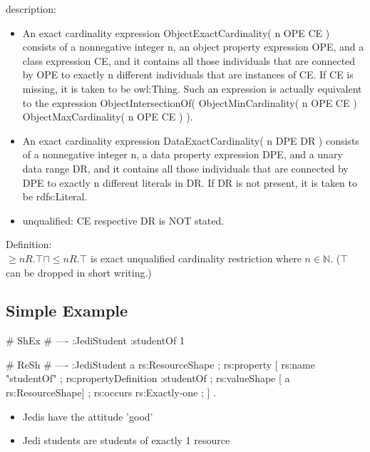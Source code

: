 \documentclass{llncs}
\newcommand{\tb}[1]{\todo[size=\small, color=blue!40]{\textbf{Thomas:} #1}}
\begin{document}
description:

\begin{itemize}
	\item An exact cardinality expression ObjectExactCardinality( n OPE CE ) consists of a nonnegative integer n, an object property expression OPE, and a class expression CE, and it contains all those individuals that are connected by OPE to exactly n different individuals that are instances of CE. If CE is missing, it is taken to be owl:Thing. Such an expression is actually equivalent to the expression ObjectIntersectionOf( ObjectMinCardinality( n OPE CE ) ObjectMaxCardinality( n OPE CE ) ).
	\item An exact cardinality expression DataExactCardinality( n DPE DR ) consists of a nonnegative integer n, a data property expression DPE, and a unary data range DR, and it contains all those individuals that are connected by DPE to exactly n different literals in DR. If DR is not present, it is taken to be rdfs:Literal. 
	\item unqualified: CE respective DR is NOT stated. 
\end{itemize}

Definition:\\

$\geq n R. \top \sqcap \leq n R. \top $ is exact unqualified cardinality restriction where $n \in \mathbb{N}$. ($\top$ can be dropped in short writing.)
\subsection{Simple Example}


\begin{ex}
# ShEx
# ----
:JediStudent {
    :studentOf {}{1} }
\end{ex}

\begin{ex}
# ReSh
# ----
:JediStudent a rs:ResourceShape ;
    rs:property [
        rs:name "studentOf" ;
        rs:propertyDefinition :studentOf ;
        rs:valueShape [ a rs:ResourceShape] ;
        rs:occurs rs:Exactly-one ; ] .
\end{ex}

\begin{itemize}
	\item Jedis have the attitude 'good'
	\item Jedi students are students of exactly 1 resource
\end{itemize}
\end{document}
